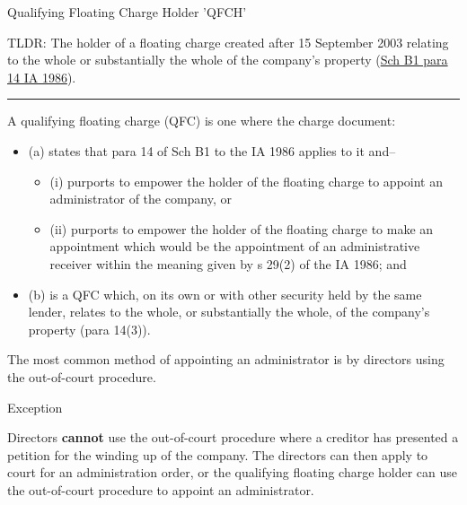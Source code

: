 \documentclass[
]{article}
\providecommand{\tightlist}{%
  \setlength{\itemsep}{0pt}\setlength{\parskip}{0pt}}
\newenvironment{env-c2ea7781-55a7-40ef-9219-ca9616c6b82e}
{
    \savenotes\tcolorbox[blanker,breakable,left=5pt,borderline west={2pt}{-4pt}{orange}]
}
{
    \endtcolorbox\spewnotes
}
\newenvironment{env-751485c0-9cbb-4b3b-8497-6bad2ef120e5}
{
    \savenotes\tcolorbox[blanker,breakable,left=5pt,borderline west={2pt}{-4pt}{gold}]
}
{
    \endtcolorbox\spewnotes
}
\begin{document}
\begin{env-751485c0-9cbb-4b3b-8497-6bad2ef120e5}

Qualifying Floating Charge Holder 'QFCH'

TLDR: The holder of a floating charge created after 15 September 2003
relating to the whole or substantially the whole of the company's
property
(\href{https://www.legislation.gov.uk/ukpga/1986/45/schedule/B1}{Sch B1
para 14 IA 1986}).

\begin{center}\rule{0.5\linewidth}{0.5pt}\end{center}

A qualifying floating charge (QFC) is one where the charge document:

\begin{itemize}
\tightlist
\item
  (a) states that para 14 of Sch B1 to the IA 1986 applies to it and--

  \begin{itemize}
  \tightlist
  \item
    (i) purports to empower the holder of the floating charge to appoint
    an administrator of the company, or
  \item
    (ii) purports to empower the holder of the floating charge to make
    an appointment which would be the appointment of an administrative
    receiver within the meaning given by s 29(2) of the IA 1986; and
  \end{itemize}
\item
  (b) is a QFC which, on its own or with other security held by the same
  lender, relates to the whole, or substantially the whole, of the
  company's property (para 14(3)).
\end{itemize}

\end{env-751485c0-9cbb-4b3b-8497-6bad2ef120e5}

The most common method of appointing an administrator is by directors
using the out-of-court procedure.

\begin{env-c2ea7781-55a7-40ef-9219-ca9616c6b82e}

Exception

Directors \textbf{cannot} use the out-of-court procedure where a
creditor has presented a petition for the winding up of the company. The
directors can then apply to court for an administration order, or the
qualifying floating charge holder can use the out-of-court procedure to
appoint an administrator.

\end{env-c2ea7781-55a7-40ef-9219-ca9616c6b82e}
\end{document}

